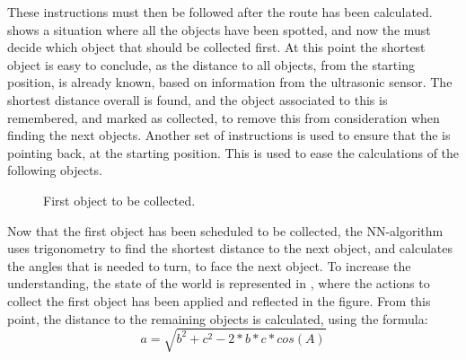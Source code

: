 These instructions must then be followed after the route has been calculated.  shows a situation where all the objects have been spotted, and now the \projname{} must decide which object that should be collected first. At this point the shortest object is easy to conclude, as the distance to all objects, from the starting position, is already known, based on information from the ultrasonic sensor. The shortest distance overall is found, and the object associated to this is remembered, and marked as collected, to remove this from consideration when finding the next objects. Another set of instructions is used to ensure that the \projname{} is pointing back, at the starting position. This is used to ease the calculations of the following objects. 

\begin{figure}[H]
     \caption{\label{fig:object_navigation_first} First object to be collected.}
\end{figure}

Now that the first object has been scheduled to be collected, the NN-algorithm uses trigonometry to find the shortest distance to the next object, and calculates the angles that is needed to turn, to face the next object. To increase the understanding, the state of the world is represented in , where the actions to collect the first object has been applied and reflected in the figure. From this point, the distance to the remaining objects is calculated, using the formula:
\begin{equation}
a = \sqrt{ b^2 + c^2 - 2*b*c*cos(A) } \label{equation:a}
\end{equation}

